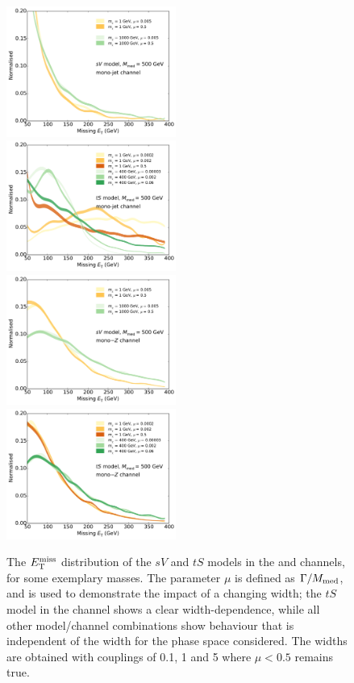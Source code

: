 \begin{figure}[t]
  \begin{center}
    \includegraphics[width=0.495\textwidth]{figures/MET_monojet_SVD.pdf}
    \includegraphics[width=0.495\textwidth]{figures/MET_monojet_TSD.pdf}
    \includegraphics[width=0.495\textwidth]{figures/MET_monoZ_SVD.pdf}
    \includegraphics[width=0.495\textwidth]{figures/MET_monoZ_TSD.pdf}
    \caption{The $E_{\mathrm{T}}^{\mathrm{miss}}$ distribution of the $sV$ and $tS$ models in the \monojet and \monoZ channels, for some exemplary masses. The parameter $\mu$ is defined as $\Gamma / M_{\mathrm{med}}$, and is used to demonstrate the impact of a changing width; the $tS$ model in the \monojet channel shows a clear width-dependence, while all other model/channel combinations show behaviour that is independent of the width for the phase space considered. The widths are obtained with couplings of 0.1, 1 and 5 where $\mu < 0.5$ remains true.}
    \label{fig:MET_dists}
  \end{center}
\end{figure}
